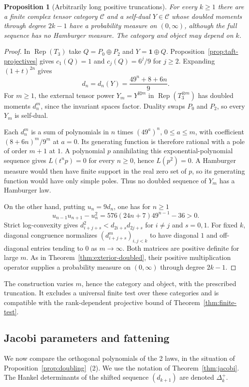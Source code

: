 \documentclass[11pt,reqno]{amsart}
\newtheorem{proposition}[theorem]{Proposition}
\theoremstyle{definition}
\newcommand{\one}{\mathbf 1}
\newcommand{\C}{\mathcal C}
\newcommand{\Rep}{\operatorname{Rep}}
\begin{document}
\begin{proposition}[Arbitrarily long positive truncations]\label{prop:long-truncations}
For every $k\ge1$ there are a finite complex tensor category $\C$ and a self-dual $Y\in\C$ whose doubled moments through degree $2k-1$ have a probability measure on $(0,\infty)$, although the full sequence has no Hamburger measure. The category and object may depend on $k$.
\end{proposition}
\begin{proof}
In $\Rep(T_3)$ take $Q=P_0\oplus P_2$ and $Y=\one\oplus Q$. Proposition~\ref{prop:taft-projectives} gives $c_1(Q)=1$ and $c_j(Q)=6^j/9$ for $j\ge2$. Expanding $(1+t)^{2n}$ gives
\[
 d_n=d_n(Y)=\frac{49^n+8+6n}{9}.
\]
For $m\ge1$, the external tensor power $Y_m=Y^{\boxtimes m}$ in $\Rep(T_3^{\otimes m})$ has doubled moments $d_n^m$, since the invariant spaces factor. Duality swaps $P_0$ and $P_2$, so every $Y_m$ is self-dual.

Each $d_n^m$ is a sum of polynomials in $n$ times $(49^a)^n$, $0\le a\le m$, with coefficient $(8+6n)^m/9^m$ at $a=0$. Its generating function is therefore rational with a pole of order $m+1$ at $1$. A polynomial $p$ annihilating this exponential-polynomial sequence gives $L(t^np)=0$ for every $n\ge0$, hence $L(p^2)=0$. A Hamburger measure would then have finite support in the real zero set of $p$, so its generating function would have only simple poles. Thus no doubled sequence of $Y_m$ has a Hamburger law.

On the other hand, putting $u_n=9d_n$, one has for $n\ge1$
\[
 u_{n-1}u_{n+1}-u_n^2=576(24n+7)49^{n-1}-36>0.
\]
Strict log-convexity gives $d_{i+j+s}^2<d_{2i+s}d_{2j+s}$ for $i\ne j$ and $s=0,1$. For fixed $k$, diagonal congruence normalizes $(d_{i+j+s}^m)_{i,j<k}$ to have diagonal $1$ and off-diagonal entries tending to $0$ as $m\to\infty$. Both matrices are positive definite for large $m$. As in Theorem~\ref{thm:exterior-doubled}, their positive multiplication operator supplies a probability measure on $(0,\infty)$ through degree $2k-1$.
\end{proof}

The construction varies $m$, hence the category and object, with the prescribed truncation. It excludes a universal finite test over these categories and is compatible with the rank-dependent projective bound of Theorem~\ref{thm:finite-test}.

\subsection{Jacobi parameters and fattening}
We now compare the orthogonal polynomials of the 2 laws, in the situation of Proposition~\ref{prop:doubling}~(2). We use the notation of Theorem~\ref{thm:jacobi}. The Hankel determinants of the shifted sequence $(d_{k+1})$ are denoted $\Delta_k^+$.
\end{document}
